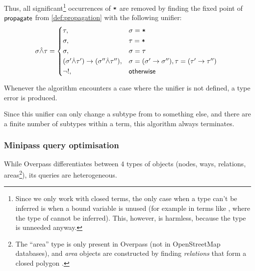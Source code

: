 \documentclass[main.tex]{subfiles}
\begin{document}
Thus, all significant\footnote{
    Since we only work with closed terms, the only case when a type can't be
    inferred is when a bound variable is unused (for example in terms like
    , where the type of  cannot be inferred).
    This, however, is harmless, because the type is unneeded anyway.
} occurrences of $\mbox{\texttt{*}}$ are removed by finding the fixed point of
$\mathsf{propagate}$ from \cref{def:propagation}
with the following unifier:
\[
    \sigma \unify \tau =
    \begin{cases*}
        \tau ,& $\sigma = \text{\code{*}}$ \\
        \sigma ,& $\tau = \text{\code{*}}$ \\
        \sigma ,& $\sigma = \tau$ \\
        (\sigma' \unify \tau') \tot (\sigma'' \unify \tau'') ,&
            $\sigma = (\sigma' \tot \sigma''), \tau = (\tau' \tot \tau'')$ \\
        \lnot ! ,& $\mathsf{otherwise}$ \\
    \end{cases*}
\]

Whenever the algorithm encounters a case where the unifier is not defined,
a type error is produced.

Since this unifier can only change a subtype from \code{*} to something else,
and there are a finite number of subtypes within a term, this algorithm
always terminates.

\subsubsection{Minipass query optimisation}
\label{sec:optimisation}
While Overpass differentiates between 4 types of objects (nodes, ways, relations,
areas\footnote{
    The ``area'' type is only present in Overpass (not in OpenStreetMap
    databases), and \emph{area} objects are constructed by finding \emph{relations}
    that form a closed polygon \cite{overpass}.
}), its queries are heterogeneous.
\end{document}
